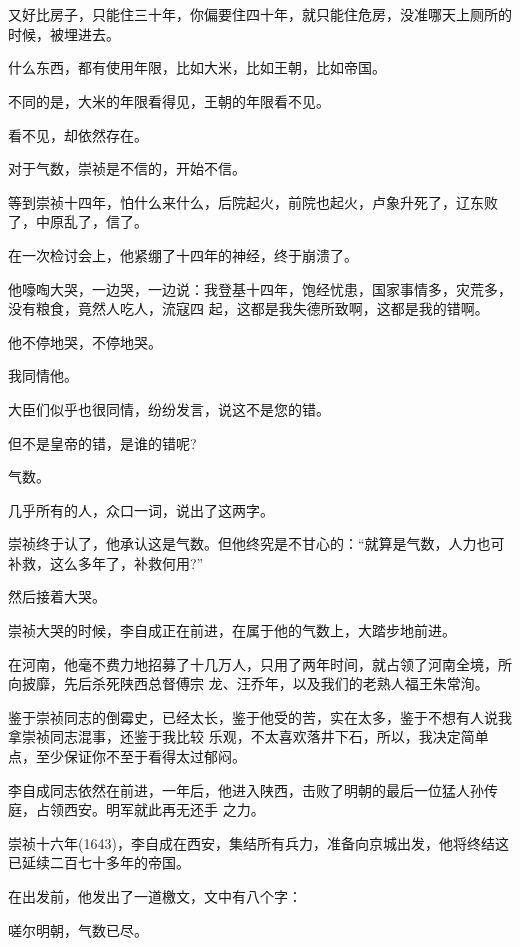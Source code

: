 \documentclass[11pt,a4paper,onecolumn]{article}
\begin{document}
\section[\thesection]{}

又好比房子，只能住三十年，你偏要住四十年，就只能住危房，没准哪天上厕所的时候，被埋进去。

什么东西，都有使用年限，比如大米，比如王朝，比如帝国。

不同的是，大米的年限看得见，王朝的年限看不见。

看不见，却依然存在。

对于气数，崇祯是不信的，开始不信。

等到崇祯十四年，怕什么来什么，后院起火，前院也起火，卢象升死了，辽东败了，中原乱了，信了。

在一次检讨会上，他紧绷了十四年的神经，终于崩溃了。

他嚎啕大哭，一边哭，一边说：我登基十四年，饱经忧患，国家事情多，灾荒多，没有粮食，竟然人吃人，流寇四
起，这都是我失德所致啊，这都是我的错啊。

他不停地哭，不停地哭。

我同情他。

大臣们似乎也很同情，纷纷发言，说这不是您的错。

但不是皇帝的错，是谁的错呢?

气数。

几乎所有的人，众口一词，说出了这两字。

崇祯终于认了，他承认这是气数。但他终究是不甘心的：``就算是气数，人力也可补救，这么多年了，补救何用?''

然后接着大哭。

崇祯大哭的时候，李自成正在前进，在属于他的气数上，大踏步地前进。

在河南，他毫不费力地招募了十几万人，只用了两年时间，就占领了河南全境，所向披靡，先后杀死陕西总督傅宗
龙、汪乔年，以及我们的老熟人福王朱常洵。

鉴于崇祯同志的倒霉史，已经太长，鉴于他受的苦，实在太多，鉴于不想有人说我拿崇祯同志混事，还鉴于我比较
乐观，不太喜欢落井下石，所以，我决定简单点，至少保证你不至于看得太过郁闷。

李自成同志依然在前进，一年后，他进入陕西，击败了明朝的最后一位猛人孙传庭，占领西安。明军就此再无还手
之力。

崇祯十六年(1643)，李自成在西安，集结所有兵力，准备向京城出发，他将终结这已延续二百七十多年的帝国。

在出发前，他发出了一道檄文，文中有八个字：

嗟尔明朝，气数已尽。
\end{document}
